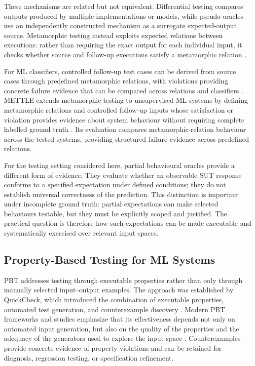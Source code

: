 \documentclass[preprint,12pt]{elsarticle}
\begin{document}
These mechanisms are related but not equivalent. Differential testing compares
outputs produced by multiple implementations or models, while pseudo-oracles
use an independently constructed mechanism as a surrogate expected-output
source. Metamorphic testing instead exploits expected relations between
executions: rather than requiring the exact output for each individual input,
it checks whether source and follow-up executions satisfy a metamorphic
relation \cite{CHEN20031,segura2016metamorphic}.

For ML classifiers, controlled follow-up test cases can be derived from source
cases through predefined metamorphic relations, with violations providing
concrete failure evidence that can be compared across relations and
classifiers \cite{xie2011metamorphicML}. METTLE extends metamorphic testing to
unsupervised ML systems by defining metamorphic relations and controlled
follow-up inputs whose satisfaction or violation provides evidence about
system behaviour without requiring complete labelled ground truth
\cite{xie2020mettle}. Its evaluation compares metamorphic-relation behaviour
across the tested systems, providing structured failure evidence across
predefined relations.

For the testing setting considered here, partial behavioural oracles provide
a different form of evidence. They evaluate whether an observable SUT
response conforms to a specified expectation under defined conditions; they
do not establish universal correctness of the prediction. This distinction
is important under incomplete ground truth: partial expectations can make
selected behaviours testable, but they must be explicitly scoped and
justified. The practical question is therefore how such expectations can be
made executable and systematically exercised over relevant input spaces.


\subsection{Property-Based Testing for ML Systems}

PBT addresses testing through executable properties rather than only through
manually selected input--output examples. The approach was established by
QuickCheck, which introduced the combination of executable properties,
automated test generation, and counterexample discovery
\cite{claessen2000quickcheck}. Modern PBT frameworks and studies emphasize
that its effectiveness depends not only on automated input generation, but
also on the quality of the properties and the adequacy of the generators used
to explore the input space
\cite{maciver2019hypothesis,lampropoulos2019coverageGuidedPBT,goldstein2024pbt}.
Counterexamples provide concrete evidence of property violations and can be
retained for diagnosis, regression testing, or specification refinement.
\end{document}
